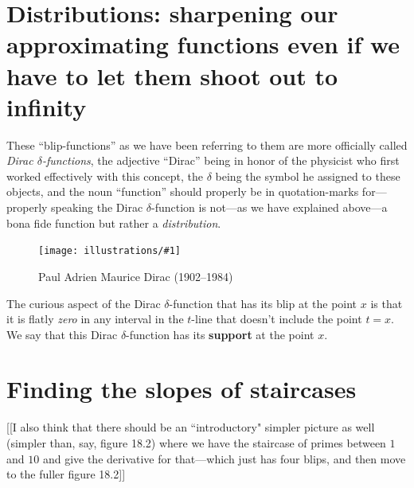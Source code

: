 \documentclass[11pt]{article}
\newcommand{\ill}[3]{ 
   \begin{figure}[H]
   \begin{center}
   \texttt{[image: illustrations/\#1]}
   \caption{#3}
   \end{center}
    \end{figure}
}
\theoremstyle{plain}
\theoremstyle{definition}
\numberwithin{equation}{section}
\numberwithin{figure}{section}
\numberwithin{table}{section}
\begin{document}
\section{Distributions: sharpening our approximating functions even if
  we have to let them shoot out to infinity}
These ``blip-functions'' as we have been referring to them are more
officially called {\em Dirac $\delta$-functions}, the adjective
``Dirac'' being in honor of the physicist who first worked effectively
with this concept, the $\delta$ being the symbol he assigned to these
objects, and the noun ``function'' should properly be in
quotation-marks for---properly speaking the Dirac $\delta$-function is
not---as we have explained above---a bona fide function but rather a
{\em distribution}.

\ill{dirac}{0.2}{Paul Adrien Maurice Dirac (1902--1984)}

   The curious aspect of the Dirac $\delta$-function that has its blip
   at the point $x$ is that it is flatly {\em zero} in any interval in
   the $t$-line that doesn't include the point $t=x$.  We say that
   this Dirac $\delta$-function has its {\bf support} at the point $x$.


\section{Finding the slopes of staircases} 

[[I also think that there should be an ``introductory" simpler picture
as well (simpler than, say, figure 18.2) where we have the staircase
of primes between $1$ and $10$ and give the derivative for
that---which just has four blips, and then move to the fuller figure
18.2]]
\end{document}
